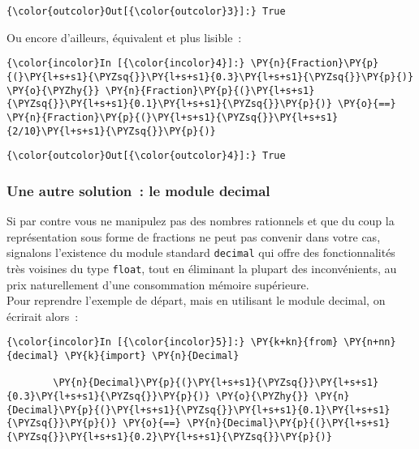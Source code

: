 \begin{Verbatim}[commandchars=\\\{\}]
{\color{outcolor}Out[{\color{outcolor}3}]:} True
\end{Verbatim}
            
    Ou encore d'ailleurs, équivalent et plus lisible~:

    \begin{Verbatim}[commandchars=\\\{\}]
{\color{incolor}In [{\color{incolor}4}]:} \PY{n}{Fraction}\PY{p}{(}\PY{l+s+s1}{\PYZsq{}}\PY{l+s+s1}{0.3}\PY{l+s+s1}{\PYZsq{}}\PY{p}{)} \PY{o}{\PYZhy{}} \PY{n}{Fraction}\PY{p}{(}\PY{l+s+s1}{\PYZsq{}}\PY{l+s+s1}{0.1}\PY{l+s+s1}{\PYZsq{}}\PY{p}{)} \PY{o}{==} \PY{n}{Fraction}\PY{p}{(}\PY{l+s+s1}{\PYZsq{}}\PY{l+s+s1}{2/10}\PY{l+s+s1}{\PYZsq{}}\PY{p}{)}
\end{Verbatim}


\begin{Verbatim}[commandchars=\\\{\}]
{\color{outcolor}Out[{\color{outcolor}4}]:} True
\end{Verbatim}
            
    \hypertarget{une-autre-solution-le-module-decimal}{%
\subsubsection{Une autre solution~: le module
decimal}\label{une-autre-solution-le-module-decimal}}

    Si par contre vous ne manipulez pas des nombres rationnels et que du
coup la représentation sous forme de fractions ne peut pas convenir dans
votre cas, signalons l'existence du module standard \texttt{decimal} qui
offre des fonctionnalités très voisines du type \texttt{float}, tout en
éliminant la plupart des inconvénients, au prix naturellement d'une
consommation mémoire supérieure.\\

    Pour reprendre l'exemple de départ, mais en utilisant le module decimal,
on écrirait alors~:

    \begin{Verbatim}[commandchars=\\\{\}]
{\color{incolor}In [{\color{incolor}5}]:} \PY{k+kn}{from} \PY{n+nn}{decimal} \PY{k}{import} \PY{n}{Decimal}
        
        \PY{n}{Decimal}\PY{p}{(}\PY{l+s+s1}{\PYZsq{}}\PY{l+s+s1}{0.3}\PY{l+s+s1}{\PYZsq{}}\PY{p}{)} \PY{o}{\PYZhy{}} \PY{n}{Decimal}\PY{p}{(}\PY{l+s+s1}{\PYZsq{}}\PY{l+s+s1}{0.1}\PY{l+s+s1}{\PYZsq{}}\PY{p}{)} \PY{o}{==} \PY{n}{Decimal}\PY{p}{(}\PY{l+s+s1}{\PYZsq{}}\PY{l+s+s1}{0.2}\PY{l+s+s1}{\PYZsq{}}\PY{p}{)}
\end{Verbatim}


